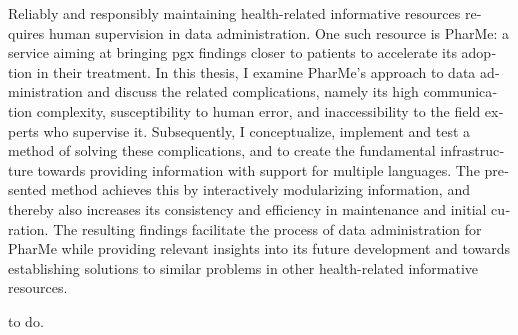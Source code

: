 \null\vfil
\begin{otherlanguage}{english}
\begin{center}\textsf{\textbf{\abstractname}}\end{center}

    \noindent Reliably and responsibly maintaining health-related informative
    resources requires human supervision in data administration. One such
    resource is PharMe: a service aiming at bringing \gls{pgx} findings closer
    to patients to accelerate its adoption in their treatment. In this thesis,
    I examine PharMe's approach to data administration and discuss the related
    complications, namely its high communication complexity, susceptibility to
    human error, and inaccessibility to the field experts who supervise it.
    Subsequently, I conceptualize, implement and test a method of solving these
    complications, and to create the fundamental infrastructure towards
    providing information with support for multiple languages. The presented
    method achieves this by interactively modularizing information, and thereby
    also increases its consistency and efficiency in maintenance and initial
    curation. The resulting findings facilitate the process of data
    administration for PharMe while providing relevant insights into its future
    development and towards establishing solutions to similar problems in other
    health-related informative resources.

\end{otherlanguage}
\vfil\null

\null\vfil
\begin{otherlanguage}{ngerman}
\begin{center}\textsf{\textbf{\abstractname}}\end{center}

    \noindent to do.

\end{otherlanguage}
\vfil\null
